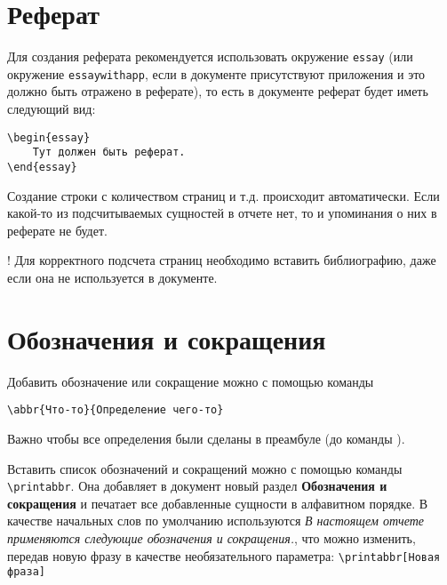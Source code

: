 \section{Реферат}

Для создания реферата рекомендуется использовать окружение \lstinline:essay:
(или окружение \lstinline:essaywithapp:, если в документе присутствуют
приложения и это должно быть отражено в реферате), то есть в документе реферат
будет иметь следующий вид: 

\newpage
{\noindent
\lstinline$\begin{essay}$\\
\lstinline$    Тут должен быть реферат.$\\
\lstinline$\end{essay}$
}

Создание строки с количеством страниц и т.д. происходит автоматически. Если
какой-то из подсчитываемых сущностей в отчете нет, то и упоминания о них в
реферате не будет.

! Для корректного подсчета страниц необходимо вставить библиографию, даже если
она не используется в документе.

\section{Обозначения и сокращения}

Добавить обозначение или сокращение можно с помощью команды

\lstinline:\abbr{Что-то}{Определение чего-то}: 

Важно чтобы все определения были сделаны в преамбуле (до команды
\lstinline::). 

Вставить список обозначений и сокращений можно с помощью
команды \lstinline:\printabbr:. Она добавляет в документ новый раздел
\textbf{Обозначения и сокращения} и печатает все добавленные сущности в
алфавитном порядке. В качестве начальных слов по умолчанию используются
\textit{В настоящем отчете применяются следующие обозначения и сокращения.}, что
можно изменить, передав новую фразу в качестве необязательного параметра:
\lstinline:\printabbr[Новая фраза]: